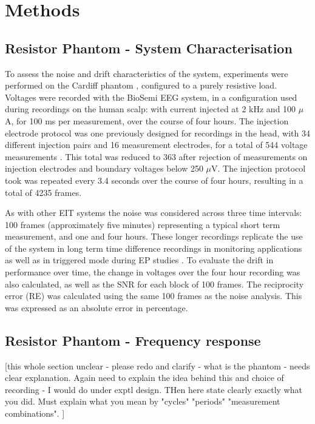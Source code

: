 \section{Methods}
\subsection{Resistor Phantom - System Characterisation}

To assess the noise and drift characteristics of the system, experiments were performed on the Cardiff phantom \cite{griffiths1995cole}, configured to a purely resistive load. Voltages were recorded with the BioSemi EEG system, in a configuration used during recordings on the human scalp: with current injected at 2 kHz and 100 $\mu$ A, for 100 ms per measurement, over the course of four hours. The injection electrode protocol was one previously designed for recordings in the head, with 34 different injection pairs and 16 measurement electrodes, for a total of 544 voltage measurements \cite{Fabrizi2009}. This total was reduced to 363 after rejection of measurements on injection electrodes and boundary voltages below 250 $\mu$V. The injection protocol took was repeated every 3.4 seconds over the course of four hours, resulting in a total of 4235 frames. 

As with other EIT systems \cite{oh2007multi} the noise was considered across three time intervals: 100 frames (approximately five minutes) representing a typical short term measurement, and one and four hours. These longer recordings replicate the use of the system in long term time difference recordings in monitoring applications \cite{fu2014use} \cite{adler2012whither} as well as in triggered mode during EP studies \cite{Aristovich_2016}. To evaluate the drift in performance over time, the change in voltages over the four hour recording was also calculated, as well as the SNR for each block of 100 frames. The reciprocity error (RE) was calculated using the same 100 frames as the noise analysis. This was expressed as an  absolute error in percentage.

\subsection{Resistor Phantom - Frequency response}

[this whole section unclear - please redo and clarify - what is the phantom - needs clear explanation. Again need to explain the idea behind this and choice of recording - I would do under exptl design. THen here state clearly exactly what you did.  Must explain what you mean by "cycles" "periods" "measurement combinations". ] 





